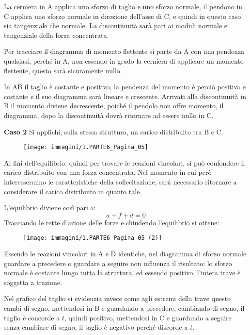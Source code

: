 \documentclass{article}
\begin{document}
\begin{adjustwidth}{2in}{}
 	La cerniera in A applica uno sforzo di taglio e uno sforzo normale, il pendono in C applica uno sforzo normale in direzione dell'asse di C, e quindi in questo caso sia tangenziale che normale. La discontinuità sarà pari ai moduli normale e tangenziale della forza concentrata.
 	
 	Per tracciare il diagramma di momento flettente si parte da A con una pendenza qualsiasi, perché in A, non essendo in grado la cerniera di applicare un momento flettente, questo sarà sicuramente nullo. 
 	
 	In AB il taglio è costante e positivo, la pendenza del momento è perciò positiva e costante e il suo diagramma sarà lineare e crescente. Arrivati alla discontinuità in B il momento diviene decrescente, poiché il pendolo non offre momento, il diagramma, dopo la discontinuità dovrà ritornare ad essere nullo in C. \newline
 	
\textbf{ Caso 2}\newline
 Si applichi, sulla stessa struttura, un carico distribuito tra B e C. 
 \begin{figure}[H]
 	\centering
 	\texttt{[image: immagini/1.PARTE6\_Pagina\_05]}
 \end{figure}
Ai fini dell'equilibrio, quindi per trovare le reazioni vincolari, si può confondere il carico distribuito con una forza concentrata. Nel momento in cui però interesseranno le caratteristiche della sollecitazione, sarà necessario ritornare a considerare il carico distribuito in quanto tale. \newline
 	
 	L'equilibrio diviene così pari a:
 	\[a + f +d =0\]
 	Tracciando le rette d'azione delle forze e chiudendo l'equilibrio si ottene:
 	 \begin{figure}[H]
 		\centering
 		\texttt{[image: immagini/1.PARTE6\_Pagina\_05 (2)]}
 	\end{figure}
 	Essendo le reazioni vincolari in A e D identiche, nel diagramma di sforzo normale guardare a precedere o guardare a seguire non influenza il risultato: lo sforzo normale è costante lungo tutta la struttura, ed essendo positivo, l'intera trave è soggetta a trazione.  
 	
 	Nel grafico del taglio si evidenzia invece come agli estremi della trave questo cambi di segno, mettendosi in B e guardando a precedere, cambiando di segno, il taglio è concorde a $t$, quindi positivo, mettendosi in C e guardando a seguire senza cambiare di segno, il taglio è negativo perché discorde a $t$.
 	

\end{adjustwidth}
\end{document}
